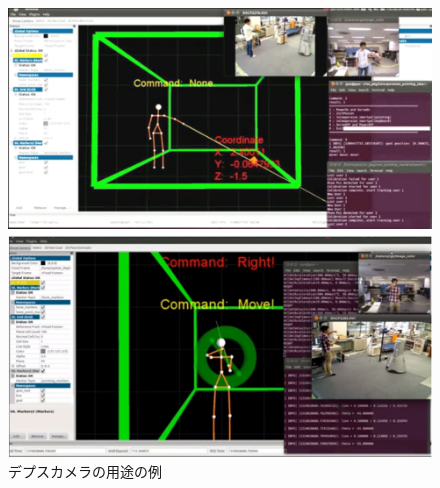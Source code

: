 \begin{figure}[ht]
  \centering
  \includegraphics[width=\columnwidth]{pictures/chapter8/pic_08_18.png}
  \caption{デプスカメラの用途の例}
\end{figure}


